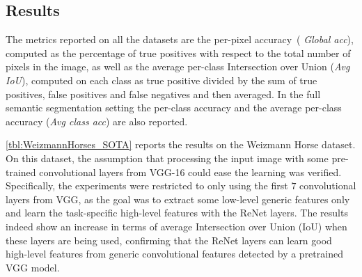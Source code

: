 \subsection{Results}\label{sec:reseg_results}

The metrics reported on all the datasets are the per-pixel accuracy~(\emph{%
Global acc}), computed as the percentage of true positives with respect to the
total number of pixels in the image, as well as the average per-class
Intersection over Union (\emph{Avg IoU}), computed on each class as true
positive divided by the sum of true positives, false positives and false
negatives and then averaged. In the full semantic segmentation setting the
per-class accuracy and the average per-class accuracy (\emph{Avg class acc})
are also reported.

\begin{table}[t]
    \caption{Weizmann Horses. Per pixel accuracy and average IoU are reported
        (higher is better).}
    \label{tbl:WeizmannHorses_SOTA}
\end{table}

\autoref{tbl:WeizmannHorses_SOTA} reports the results on the Weizmann
Horse dataset. On this dataset, the assumption that processing the input image
with some pre-trained convolutional layers from VGG-16 could ease the learning
was verified. Specifically, the experiments were restricted to only using the
first $7$ convolutional layers from VGG, as the goal was to extract some
low-level generic features only and learn the task-specific high-level features
with the ReNet layers. The results indeed show an increase in terms of average
Intersection over Union (IoU) when these layers are being used, confirming that
the ReNet layers can learn good high-level features from generic convolutional
features detected by a pretrained VGG model.

